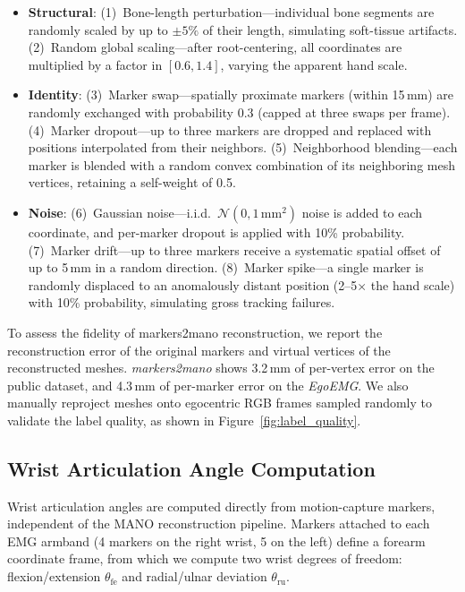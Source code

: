 \documentclass{article}
\newcommand{\dataset}{\textit{EgoEMG}}
\newcommand{\marker}{\textit{markers2mano}}
\begin{document}
\begin{itemize}[leftmargin=1.5em,nosep]
    \item \textbf{Structural}: 
    (1)~Bone-length perturbation---individual bone segments are randomly scaled by up to \(\pm 5\%\) of their length, simulating soft-tissue artifacts.
    (2)~Random global scaling---after root-centering, all coordinates are multiplied by a factor in \([0.6, 1.4]\), varying the apparent hand scale.
    \item \textbf{Identity}: 
    (3)~Marker swap---spatially proximate markers (within 15\,mm) are randomly exchanged with probability 0.3 (capped at three swaps per frame).
    (4)~Marker dropout---up to three markers are dropped and replaced with positions interpolated from their neighbors.
    (5)~Neighborhood blending---each marker is blended with a random convex combination of its neighboring mesh vertices, retaining a self-weight of 0.5.
    \item \textbf{Noise}: 
    (6)~Gaussian noise---i.i.d.\ \(\mathcal{N}(0, 1\,\text{mm}^2)\) noise is added to each coordinate, and per-marker dropout is applied with 10\% probability.
    (7)~Marker drift---up to three markers receive a systematic spatial offset of up to 5\,mm in a random direction.
    (8)~Marker spike---a single marker is randomly displaced to an anomalously distant position (2--5\(\times\) the hand scale) with 10\% probability, simulating gross tracking failures.
\end{itemize}

To assess the fidelity of markers2mano reconstruction, we report the reconstruction error of the original markers and virtual vertices of the reconstructed meshes. \marker{} shows 3.2\,mm of per-vertex error on the public dataset, and 4.3\,mm of per-marker error on the \dataset{}. We also manually reproject meshes onto egocentric RGB frames sampled randomly to validate the label quality, as shown in Figure~\ref{fig:label_quality}.

\subsection{Wrist Articulation Angle Computation}
\label{app:wrist_angles}

Wrist articulation angles are computed directly from motion-capture markers,
independent of the MANO reconstruction pipeline. Markers attached to each EMG
armband (4 markers on the right wrist, 5 on the left) define a forearm
coordinate frame, from which we compute two wrist degrees of freedom:
flexion/extension $\theta_{\text{fe}}$ and radial/ulnar deviation
$\theta_{\text{ru}}$.
\end{document}
